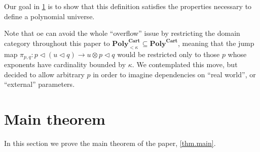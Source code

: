 \documentclass[11pt, one side, article]{memoir}
\theoremstyle{definition}
\theoremstyle{plain}
\renewcommand{\ss}{\subseteq}
\newcommand{\Cat}[1]{\mathbf{#1}}%
\newcommand{\poly}{\Cat{Poly}}
\newcommand{\polycart}{\poly^{\Cat{Cart}}}
\newcommand{\0}{\textsf{0}}
\newcommand{\1}{\tn{\textsf{1}}}
\newcommand{\tri}{\mathbin{\triangleleft}}
\newcommand{\jump}{\pi}
\begin{document}
Our goal in \cref{sec.main_thm} is to show that this definition satisfies the properties necessary to define a polynomial universe. 

Note that oe can avoid the whole ``overflow'' issue by restricting the domain category throughout this paper to $\polycart_{<\kappa}\ss\polycart$, meaning that the jump map $\jump_{p,q}\colon p\tri (u\tri q)\to u\otimes p\tri q$ would be restricted only to those $p$ whose exponents have cardinality bounded by $\kappa$. We contemplated this move, but decided to allow arbitrary $p$ in order to imagine dependencies on ``real world'', or ``external'' parameters.

\section{Main theorem}\label{sec.main_thm}

In this section we prove the main theorem of the paper, \cref{thm.main}.
\end{document}
